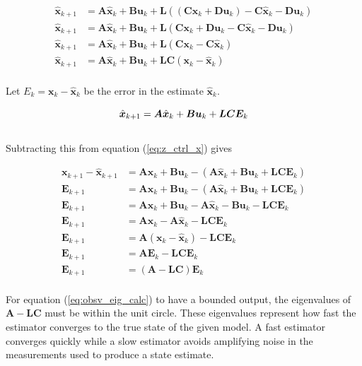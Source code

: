 \documentclass[10pt,conference,compsoc]{IEEEtran}
\newcommand{\mtx}[1] {\bm #1}
\begin{document}
\begin{align*}
  \hat{\mtx{x}}_{k+1} &= \mtx{A}\hat{\mtx{x}}_k + \mtx{B}\mtx{u}_k +
    \mtx{L}((\mtx{C}\mtx{x}_k + \mtx{D}\mtx{u}_k) - \mtx{C}\hat{\mtx{x}}_k -
    \mtx{D}\mtx{u}_k) \\
  \hat{\mtx{x}}_{k+1} &= \mtx{A}\hat{\mtx{x}}_k + \mtx{B}\mtx{u}_k +
    \mtx{L}(\mtx{C}\mtx{x}_k + \mtx{D}\mtx{u}_k - \mtx{C}\hat{\mtx{x}}_k -
    \mtx{D}\mtx{u}_k) \\
  \hat{\mtx{x}}_{k+1} &= \mtx{A}\hat{\mtx{x}}_k + \mtx{B}\mtx{u}_k +
    \mtx{L}(\mtx{C}\mtx{x}_k - \mtx{C}\hat{\mtx{x}}_k) \\
  \hat{\mtx{x}}_{k+1} &= \mtx{A}\hat{\mtx{x}}_k + \mtx{B}\mtx{u}_k +
    \mtx{L}\mtx{C}(\mtx{x}_k - \hat{\mtx{x}}_k) \\
\end{align*}

Let $E_k = \mtx{x}_k - \hat{\mtx{x}}_k$ be the error in the estimate
$\hat{\mtx{x}}_k$.

\begin{equation*}
  \hat{\mtx{x}}_{k+1} = \mtx{A}\hat{\mtx{x}}_k + \mtx{B}\mtx{u}_k +
    \mtx{L}\mtx{C}\mtx{E}_k \\
\end{equation*}
\\
Subtracting this from equation (\ref{eq:z_ctrl_x}) gives

\begin{align}
  \mtx{x}_{k+1} - \hat{\mtx{x}}_{k+1} &= \mtx{A}\mtx{x}_k + \mtx{B}\mtx{u}_k -
    (\mtx{A}\hat{\mtx{x}}_k + \mtx{B}\mtx{u}_k +
     \mtx{L}\mtx{C}\mtx{E}_k) \nonumber \\
  \mtx{E}_{k+1} &= \mtx{A}\mtx{x}_k + \mtx{B}\mtx{u}_k -
    (\mtx{A}\hat{\mtx{x}}_k + \mtx{B}\mtx{u}_k + \mtx{L}\mtx{C}\mtx{E}_k)
    \nonumber \\
  \mtx{E}_{k+1} &= \mtx{A}\mtx{x}_k + \mtx{B}\mtx{u}_k -
    \mtx{A}\hat{\mtx{x}}_k - \mtx{B}\mtx{u}_k - \mtx{L}\mtx{C}\mtx{E}_k
    \nonumber \\
  \mtx{E}_{k+1} &= \mtx{A}\mtx{x}_k - \mtx{A}\hat{\mtx{x}}_k -
    \mtx{L}\mtx{C}\mtx{E}_k \nonumber \\
  \mtx{E}_{k+1} &= \mtx{A}(\mtx{x}_k - \hat{\mtx{x}}_k) -
    \mtx{L}\mtx{C}\mtx{E}_k \nonumber \\
  \mtx{E}_{k+1} &= \mtx{A}\mtx{E}_k - \mtx{L}\mtx{C}\mtx{E}_k \nonumber \\
  \mtx{E}_{k+1} &= (\mtx{A} - \mtx{L}\mtx{C})\mtx{E}_k \label{eq:obsv_eig_calc}
\end{align}
\\
For equation (\ref{eq:obsv_eig_calc}) to have a bounded output, the eigenvalues
of $\mtx{A} - \mtx{L}\mtx{C}$ must be within the unit circle. These eigenvalues
represent how fast the estimator converges to the true state of the given model.
A fast estimator converges quickly while a slow estimator avoids amplifying
noise in the measurements used to produce a state estimate. \\
\end{document}
